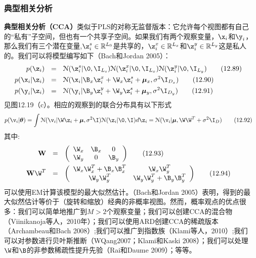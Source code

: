 \documentclass[a4paper]{article}
\begin{document}
\subsubsection{典型相关分析}
\textbf{典型相关分析（CCA）}类似于PLS的对称无监督版本：它允许每个视图都有自己的“私有”子空间，但也有一个共享子空间。如果我们有两个观察变量，$\x_i$和$\y_i$，那么我们有三个潜在变量,$\z_i^s\in \mathbb{R}^{L_0}$是共享的，$\z_i^x\in \mathbb{R}^{L_x}$和$\z_i^y\in \mathbb{R}^{L_y}$这是私人的。我们可以将模型编写如下（Bach和Jordan 2005）：
\begin{align}
	p(\z_i)\ \ &=\ \ \mathcal{N}(\z_{i}^s|\0,\I_{L_s})\mathcal{N}(\z_i^x|\0,\I_{L_x})\mathcal{N}(\z_i^y|\0,\I_{L_y})\tag{12.89}\\
	p(\x_i|\z_i)\ \ &=\ \ \mathcal{N}(\x_i|\B_x\z_i^x+\W_x\z_{i}^s+\boldsymbol{\mu}_x,\sigma^2\I_{D_x})\tag{12.90}\\
	p(\y_i|\z_i)\ \ &=\ \ \mathcal{N}(\y_i|\B_y\z_i^y+\W_y\z_{i}^s+\boldsymbol{\mu}_y,\sigma^2\I_{D_y})\tag{12.91}
\end{align}
见图12.19（c）。相应的观察到的联合分布具有以下形式 
\begin{equation}
p(\v_i|\boldsymbol{\theta})=\int \mathcal{N}(\v_i|\W\z_i+\boldsymbol{\mu},\sigma^2\I)\mathcal{N}(\z_i|\0,\I)d\z_i=\mathcal{N}(\v_i|\boldsymbol{\mu},\W\W^T+\sigma^2\I_D)\tag{12.92}
\end{equation}
其中:
\begin{align}
\mathbf{W} \ \ &=\ \  \left(
\begin{array}{cccc}
\W_x &\B_x &0  \\
\W_y &0 & \B_y \\
\end{array} \right)\tag{12.93}\\
\mathbf{W}\W^T \ \ &=\ \  \left(
\begin{array}{cccc}
\W_x\W_x^T+\B_x\B_x^T & \W_x\W_y^T \\
\W_y\W_y^T & \W_y\W_y^T+\B_y\B_y^T  \\
\end{array} \right)\tag{12.94}
\end{align}
可以使用EM计算该模型的最大似然估计。（Bach和Jordan 2005）表明，得到的最大似然估计等价于（旋转和缩放）经典的非概率视图。然而，概率观点的优点很多：我们可以简单地推广到$M>2$个观察变量；我们可以创建CCA的混合物（Viinikanoja等人，2010年）；我们可以使用ARD创建CCA的稀疏版本（Archambeau和Bach 2008）;我们可以推广到指数族（Klami等人，2010）;我们可以对参数进行贝叶斯推断（WQang2007；Klami和Kaski 2008）；我们可以处理$\W$和$\B$的非参数稀疏性提升先验（Rai和Daume 2009）；等等。
\end{document}

